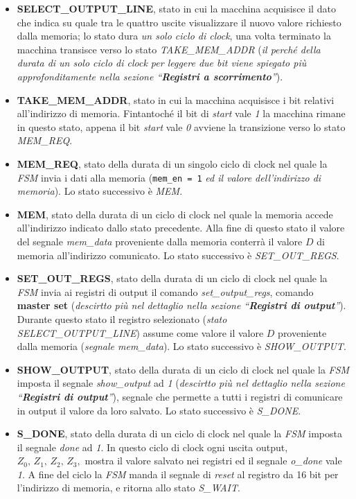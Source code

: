 \begin{itemize}
\tightlist
\item
  \textbf{SELECT\_OUTPUT\_LINE}, stato in cui la macchina acquisisce il
  dato che indica su quale tra le quattro uscite visualizzare il nuovo
  valore richiesto dalla memoria; lo stato dura \emph{un solo ciclo di
  clock}, una volta terminato la macchina transisce verso lo stato
  \emph{TAKE\_MEM\_ADDR} (\emph{il perché della durata di un solo ciclo
  di clock per leggere due bit viene spiegato più approfonditamente
  nella sezione ``\textbf{Registri a scorrimento}''}).
\item
  \textbf{TAKE\_MEM\_ADDR}, stato in cui la macchina acquisisce i bit
  relativi all'indirizzo di memoria. Fintantoché il bit di \emph{start}
  vale \emph{1} la macchina rimane in questo stato, appena il bit
  \emph{start} vale \emph{0} avviene la transizione verso lo stato
  \emph{MEM\_REQ}.
\item
  \textbf{MEM\_REQ}, stato della durata di un singolo ciclo di clock nel
  quale la \emph{FSM} invia i dati alla memoria (\texttt{mem\_en\ =\ 1}
  \emph{ed il valore dell'indirizzo di memoria}). Lo stato successivo è
  \emph{MEM}.
\item
  \textbf{MEM}, stato della durata di un ciclo di clock nel quale la
  memoria accede all'indirizzo indicato dallo stato precedente. Alla
  fine di questo stato il valore del segnale \emph{mem\_data}
  proveniente dalla memoria conterrà il valore \(D\) di memoria
  all'indirizzo comunicato. Lo stato successivo è \emph{SET\_OUT\_REGS}.
\item
  \textbf{SET\_OUT\_REGS}, stato della durata di un ciclo di clock nel
  quale la \emph{FSM} invia ai registri di output il comando
  \emph{set\_output\_regs}, comando \textbf{master set} (\emph{descirtto
  più nel dettaglio nella sezione ``\textbf{Registri di output}''}).
  Durante questo stato il registro selezionato (\emph{stato
  SELECT\_OUTPUT\_LINE}) assume come valore il valore \(D\) proveniente
  dalla memoria (\emph{segnale mem\_data}). Lo stato successivo è
  \emph{SHOW\_OUTPUT}.
\item
  \textbf{SHOW\_OUTPUT}, stato della durata di un ciclo di clock nel
  quale la \emph{FSM} imposta il segnale \emph{show\_output} ad \emph{1}
  (\emph{descirtto più nel dettaglio nella sezione ``\textbf{Registri di
  output}''}), segnale che permette a tutti i registri di comunicare in
  output il valore da loro salvato. Lo stato successivo è
  \emph{S\_DONE}.
\item
  \textbf{S\_DONE}, stato della durata di un ciclo di clock nel quale la
  \emph{FSM} imposta il segnale \emph{done} ad \emph{1}. In questo ciclo
  di clock ogni uscita output, \(Z_0,\,Z_1,\,Z_2,\,Z_3,\) mostra il
  valore salvato nei registri ed il segnale \emph{o\_done} vale
  \emph{1}. A fine del ciclo la \emph{FSM} manda il segnale di
  \emph{reset} al registro da 16 bit per l'indirizzo di memoria, e
  ritorna allo stato \emph{S\_WAIT}.
\end{itemize}

